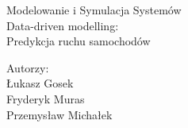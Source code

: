 \documentclass[a4paper,11pt]{article}
\begin{document}
\begin{center}
	\Huge{Modelowanie i Symulacja Systemów\\
		Data-driven modelling:\\ Predykcja ruchu samochodów\\}
	\date{}

	\vspace{3cm}
	\Large{	Autorzy:\\
		Łukasz Gosek\\
		Fryderyk Muras\\
		Przemysław Michałek\\}

	\newpage

	
\end{center}
\end{document}
